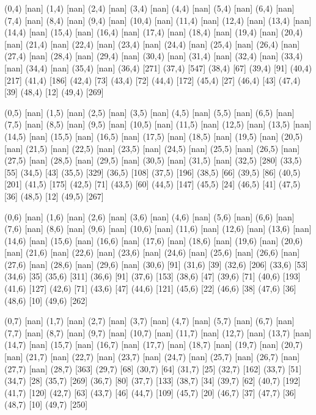 {(0,4) [nan] (1,4) [nan] (2,4) [nan] (3,4) [nan] (4,4) [nan] (5,4) [nan] (6,4) [nan] (7,4) [nan] (8,4) [nan] (9,4) [nan] (10,4) [nan] (11,4) [nan] (12,4) [nan] (13,4) [nan] (14,4) [nan] (15,4) [nan] (16,4) [nan] (17,4) [nan] (18,4) [nan] (19,4) [nan] (20,4) [nan] (21,4) [nan] (22,4) [nan] (23,4) [nan] (24,4) [nan] (25,4) [nan] (26,4) [nan] (27,4) [nan] (28,4) [nan] (29,4) [nan] (30,4) [nan] (31,4) [nan] (32,4) [nan] (33,4) [nan] (34,4) [nan] (35,4) [nan] (36,4) [271] (37,4) [547] (38,4) [67] (39,4) [91] (40,4) [217] (41,4) [186] (42,4) [73] (43,4) [72] (44,4) [172] (45,4) [27] (46,4) [43] (47,4) [39] (48,4) [12] (49,4) [269] 

(0,5) [nan] (1,5) [nan] (2,5) [nan] (3,5) [nan] (4,5) [nan] (5,5) [nan] (6,5) [nan] (7,5) [nan] (8,5) [nan] (9,5) [nan] (10,5) [nan] (11,5) [nan] (12,5) [nan] (13,5) [nan] (14,5) [nan] (15,5) [nan] (16,5) [nan] (17,5) [nan] (18,5) [nan] (19,5) [nan] (20,5) [nan] (21,5) [nan] (22,5) [nan] (23,5) [nan] (24,5) [nan] (25,5) [nan] (26,5) [nan] (27,5) [nan] (28,5) [nan] (29,5) [nan] (30,5) [nan] (31,5) [nan] (32,5) [280] (33,5) [55] (34,5) [43] (35,5) [329] (36,5) [108] (37,5) [196] (38,5) [66] (39,5) [86] (40,5) [201] (41,5) [175] (42,5) [71] (43,5) [60] (44,5) [147] (45,5) [24] (46,5) [41] (47,5) [36] (48,5) [12] (49,5) [267] 

(0,6) [nan] (1,6) [nan] (2,6) [nan] (3,6) [nan] (4,6) [nan] (5,6) [nan] (6,6) [nan] (7,6) [nan] (8,6) [nan] (9,6) [nan] (10,6) [nan] (11,6) [nan] (12,6) [nan] (13,6) [nan] (14,6) [nan] (15,6) [nan] (16,6) [nan] (17,6) [nan] (18,6) [nan] (19,6) [nan] (20,6) [nan] (21,6) [nan] (22,6) [nan] (23,6) [nan] (24,6) [nan] (25,6) [nan] (26,6) [nan] (27,6) [nan] (28,6) [nan] (29,6) [nan] (30,6) [91] (31,6) [39] (32,6) [206] (33,6) [53] (34,6) [35] (35,6) [311] (36,6) [91] (37,6) [153] (38,6) [47] (39,6) [71] (40,6) [193] (41,6) [127] (42,6) [71] (43,6) [47] (44,6) [121] (45,6) [22] (46,6) [38] (47,6) [36] (48,6) [10] (49,6) [262] 

(0,7) [nan] (1,7) [nan] (2,7) [nan] (3,7) [nan] (4,7) [nan] (5,7) [nan] (6,7) [nan] (7,7) [nan] (8,7) [nan] (9,7) [nan] (10,7) [nan] (11,7) [nan] (12,7) [nan] (13,7) [nan] (14,7) [nan] (15,7) [nan] (16,7) [nan] (17,7) [nan] (18,7) [nan] (19,7) [nan] (20,7) [nan] (21,7) [nan] (22,7) [nan] (23,7) [nan] (24,7) [nan] (25,7) [nan] (26,7) [nan] (27,7) [nan] (28,7) [363] (29,7) [68] (30,7) [64] (31,7) [25] (32,7) [162] (33,7) [51] (34,7) [28] (35,7) [269] (36,7) [80] (37,7) [133] (38,7) [34] (39,7) [62] (40,7) [192] (41,7) [120] (42,7) [63] (43,7) [46] (44,7) [109] (45,7) [20] (46,7) [37] (47,7) [36] (48,7) [10] (49,7) [250] 

}
